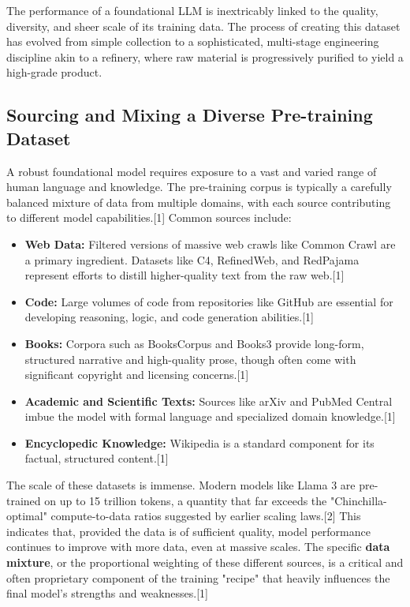 \documentclass[12pt, a4paper]{article}
\begin{document}
The performance of a foundational LLM is inextricably linked to the quality, diversity, and sheer scale of its training data. The process of creating this dataset has evolved from simple collection to a sophisticated, multi-stage engineering discipline akin to a refinery, where raw material is progressively purified to yield a high-grade product.

\subsection{Sourcing and Mixing a Diverse Pre-training Dataset}

A robust foundational model requires exposure to a vast and varied range of human language and knowledge. The pre-training corpus is typically a carefully balanced mixture of data from multiple domains, with each source contributing to different model capabilities.[1] Common sources include:

\begin{itemize}
    \item \textbf{Web Data:} Filtered versions of massive web crawls like Common Crawl are a primary ingredient. Datasets like C4, RefinedWeb, and RedPajama represent efforts to distill higher-quality text from the raw web.[1]
    \item \textbf{Code:} Large volumes of code from repositories like GitHub are essential for developing reasoning, logic, and code generation abilities.[1]
    \item \textbf{Books:} Corpora such as BooksCorpus and Books3 provide long-form, structured narrative and high-quality prose, though often come with significant copyright and licensing concerns.[1]
    \item \textbf{Academic and Scientific Texts:} Sources like arXiv and PubMed Central imbue the model with formal language and specialized domain knowledge.[1]
    \item \textbf{Encyclopedic Knowledge:} Wikipedia is a standard component for its factual, structured content.[1]
\end{itemize}

The scale of these datasets is immense. Modern models like Llama 3 are pre-trained on up to 15 trillion tokens, a quantity that far exceeds the "Chinchilla-optimal" compute-to-data ratios suggested by earlier scaling laws.[2] This indicates that, provided the data is of sufficient quality, model performance continues to improve with more data, even at massive scales. The specific \textbf{data mixture}, or the proportional weighting of these different sources, is a critical and often proprietary component of the training "recipe" that heavily influences the final model's strengths and weaknesses.[1]
\end{document}

